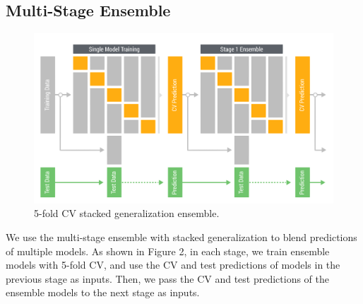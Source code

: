 \subsection{Multi-Stage Ensemble}

\begin{figure}[!h]
  \centering
    \includegraphics[width=0.5 \textwidth]{cv_ensemble}
      \caption{5-fold CV stacked generalization ensemble.}
\end{figure}

We use the multi-stage ensemble with stacked generalization \cite{wolpert1992stacked, ting1999issues} to blend predictions of multiple models.  As shown in Figure 2, in each stage, we train ensemble models with 5-fold CV, and use the CV and test predictions of models in the previous stage as inputs.  Then, we pass the CV and test predictions of the ensemble models to the next stage as inputs.


